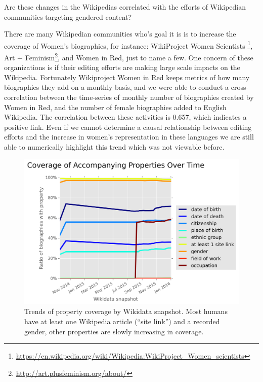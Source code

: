 \documentclass{sig-alternate-05-2015}
\begin{document}
Are these changes in the Wikipedias correlated with the efforts of Wikipedian communities targeting gendered content?

There are many Wikipedian communities who's goal it is is to increase the coverage of Women's biographies, for instance: Wiki\-Project Women Scientists \footnote{\url{https://en.wikipedia.org/wiki/Wikipedia:WikiProject_Women_scientists}}, Art + Feminism\footnote{\url{http://art.plusfeminism.org/about/}}, and Women in Red, just to name a few. One concern of these organizations is if their editing efforts are making large scale impacts on the Wikipedia. Fortunately Wikiproject Women in Red keeps metrics of how many biographies they add on a monthly basis, and we were able to conduct a cross-correlation between the time-series of monthly number of biographies created by Women in Red, and the number of female biographies added to English Wikipedia. The correlation between these activities is 0.657, which indicates a positive link. Even if we cannot determine a causal relationship between editing efforts and the increase in women's representation in these languages we are still able to numerically highlight this trend which was not viewable before.

\begin{figure}
\includegraphics[width=\columnwidth]{figures/additionalprops.png} 
\caption{Trends of property coverage by Wikidata snapshot. Most humans have at least one Wikipedia article (``site link'') and a recorded gender, other properties are slowly increasing in coverage.}
\label{fig:accompanying}
\end{figure}
\end{document}
